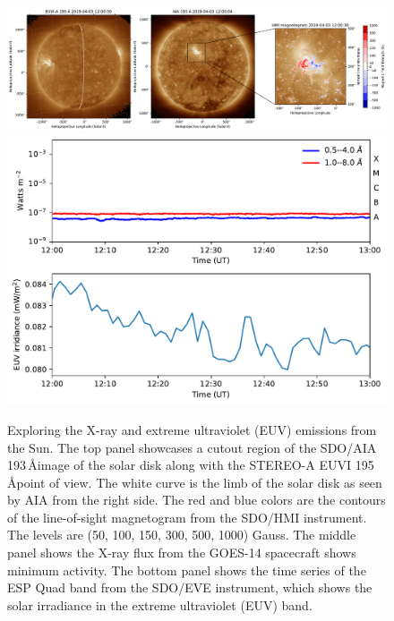 \begin{figure}[ht]
\centering
\includegraphics[width=\hsize]{chapter3/figs/aia_sta_cutout.pdf}
\includegraphics[width=12cm]{chapter3/figs/xrs_eve.pdf}
\caption{Exploring the X-ray and extreme ultraviolet (EUV) emissions from the Sun. The top panel showcases a cutout region of the SDO/AIA 193\,\AA image of the solar disk along with the STEREO-A EUVI 195\,\AA point of view. The white curve is the limb of the solar disk as seen by AIA from the right side. The red and blue colors are the contours of the line-of-sight magnetogram from the SDO/HMI instrument. The levels are (50, 100, 150, 300, 500, 1000) Gauss. The middle panel shows the X-ray flux from the GOES-14 spacecraft shows minimum activity. The bottom panel shows the time series of the ESP Quad band from the SDO/EVE instrument, which shows the solar irradiance in the extreme ultraviolet (EUV) band.}
\label{soldisk_xrs}
\end{figure}

